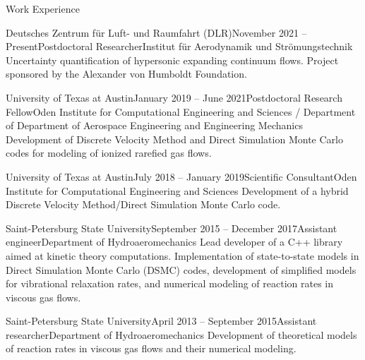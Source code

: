 \documentclass{resume} %
\begin{document}

\begin{rSection}{Work Experience}

\begin{rSubsection}{Deutsches Zentrum f\"{u}r Luft- und Raumfahrt (DLR)}{November 2021 -- Present}{Postdoctoral Researcher}{Institut f\"{u}r Aerodynamik und Str\"{o}mungstechnik}
Uncertainty quantification of hypersonic expanding continuum flows. Project sponsored by the Alexander von Humboldt Foundation.
\end{rSubsection}

\begin{rSubsection}{University of Texas at Austin}{January 2019 -- June 2021}{Postdoctoral Research Fellow}{Oden Institute for Computational Engineering and Sciences / Department of Department of Aerospace Engineering and Engineering Mechanics}
Development of Discrete Velocity Method and Direct Simulation Monte Carlo codes for modeling of ionized rarefied gas flows.
\end{rSubsection}


\begin{rSubsection}{University of Texas at Austin}{July 2018 -- January 2019}{Scientific Consultant}{Oden Institute for Computational Engineering and Sciences}
Development of a hybrid Discrete Velocity Method/Direct Simulation Monte Carlo code.
\end{rSubsection}

\begin{rSubsection}{Saint-Petersburg State University}{September 2015 -- December 2017}{Assistant engineer}{Department of Hydroaeromechanics}
Lead developer of a C++ library aimed at kinetic theory computations. Implementation of state-to-state models in Direct Simulation Monte Carlo (DSMC) codes, development of simplified models for vibrational relaxation rates, and numerical modeling of reaction rates in viscous gas flows.
\end{rSubsection}

\begin{rSubsection}{Saint-Petersburg State University}{April 2013 -- September 2015}{Assistant researcher}{Department of Hydroaeromechanics}
Development of theoretical models of reaction rates in viscous gas flows and their numerical modeling.
\end{rSubsection}


\end{rSection}
\end{document}
